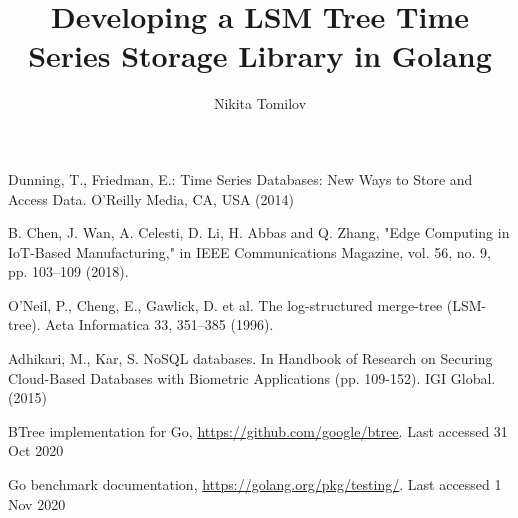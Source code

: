 \documentclass[runningheads]{llncs}
\begin{document}
%
\title{Developing a LSM Tree Time Series Storage Library in Golang}
%
%
\author{Nikita Tomilov}
%
%
%
\maketitle              %
%
\begin{abstract}


\end{abstract}
%
%
%




%
%
%
% 
% 
%
\begin{thebibliography}{8}
Dunning, T., Friedman, E.: Time Series Databases: New Ways to Store and Access Data. O'Reilly Media, CA, USA  (2014)

B. Chen, J. Wan, A. Celesti, D. Li, H. Abbas and Q. Zhang, "Edge Computing in IoT-Based Manufacturing," in IEEE Communications Magazine, vol. 56, no. 9, pp. 103--109 (2018). 

O’Neil, P., Cheng, E., Gawlick, D. et al. The log-structured merge-tree (LSM-tree). Acta Informatica 33, 351--385 (1996). 

Adhikari, M., Kar, S. NoSQL databases. In Handbook of Research on Securing Cloud-Based Databases with Biometric Applications (pp. 109-152). IGI Global. (2015)

BTree implementation for Go, \url{https://github.com/google/btree}. Last accessed 31
Oct 2020

Go benchmark documentation, \url{https://golang.org/pkg/testing/}. Last accessed 1
Nov 2020

\end{thebibliography}
\end{document}
